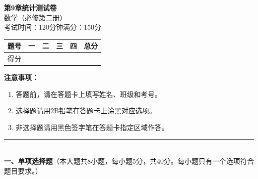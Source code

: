 \documentclass[12pt, a4paper]{ctexart}
\begin{document}
\begin{center}
{\Large\bfseries 第9章\quad 统计\quad 测试卷}\\[6pt]
{\normalsize 数学（必修第二册）}\\[4pt]
{\small 考试时间：120分钟\quad 满分：150分}
\end{center}

\vspace{2pt}
\begin{center}
\begin{tabular}{|c|c|c|c|c|}
\hline
题号 & 一 & 二 & 三 & 四 & 总分 \\ \hline
得分 & & & & & \\ \hline
\end{tabular}
\end{center}
\vspace{4pt}

\noindent\textbf{注意事项：}
\begin{enumerate}[leftmargin=2em]
  \item 答题前，请在答题卡上填写姓名、班级和考号。
  \item 选择题请用2B铅笔在答题卡上涂黑对应选项。
  \item 非选择题请用黑色签字笔在答题卡指定区域作答。
\end{enumerate}

\vspace{6pt}

\noindent\rule{\textwidth}{0.4pt}\\[2pt]
{\large\bfseries 一、单项选择题}（本大题共8小题，每小题5分，共40分。每小题只有一个选项符合题目要求。）

\vspace{6pt}
\end{document}
